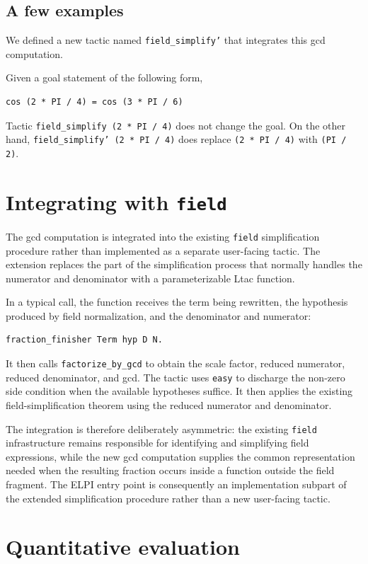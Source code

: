 \documentclass[11pt]{article}
\begin{document}
\subsection{A few examples}
We defined a new tactic named {\tt field\_simplify'} that integrates this
gcd computation.

Given a goal statement of the following form, 
\begin{lstlisting}
cos (2 * PI / 4) = cos (3 * PI / 6)
\end{lstlisting}
Tactic {\tt field\_simplify (2 * PI / 4)} does not change the goal.  On the other hand, {\tt field\_simplify' (2 * PI / 4)} does replace {\tt (2 * PI / 4)}
with {\tt (PI / 2)}.

\section{Integrating with \texttt{field}}


The gcd computation is integrated into the existing \texttt{field}
simplification procedure rather than implemented as a separate user-facing
tactic. The extension replaces the part of the simplification process that
normally handles the numerator and denominator with a parameterizable Ltac
function.

In a typical call, the function receives the term being rewritten, the
hypothesis produced by field normalization, and the denominator and numerator:
\begin{lstlisting}[language=ML]
fraction_finisher Term hyp D N.
\end{lstlisting}

It then calls \texttt{factorize\_by\_gcd} to obtain the scale factor, reduced
numerator, reduced denominator, and gcd. The tactic uses \texttt{easy} to discharge the non-zero side condition when the available hypotheses suffice. It then applies the existing field-simplification theorem using the reduced numerator and denominator.


The integration is therefore deliberately asymmetric: the existing
\texttt{field} infrastructure remains responsible for identifying and
simplifying field expressions, while the new gcd computation supplies the
common representation needed when the resulting fraction occurs inside a
function outside the field fragment. The ELPI entry point is consequently an
implementation subpart of the extended simplification procedure rather than a
new user-facing tactic.

\section{Quantitative evaluation}
\end{document}
